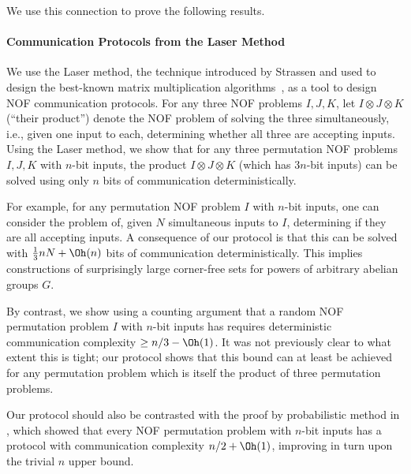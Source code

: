 We use this connection to prove the following results.

    \paragraph{Communication Protocols from the Laser Method} We use the Laser method, the technique introduced by Strassen and used to design the best-known matrix multiplication algorithms~\cite{S86,CW87}, as a tool to design NOF communication protocols. For any three NOF problems $I, J, K$, let $I \otimes J \otimes K$ (``their product'') denote the NOF problem of solving the three simultaneously, i.e., given one input to each, determining whether all three are accepting inputs. Using the Laser method, we show that for any three permutation NOF problems $I, J, K$ with $n$-bit inputs, the product $I \otimes J \otimes K$ (which has $3n$-bit inputs) can be solved using only $n$ bits of communication deterministically.
    
    For example, for any permutation NOF problem $I$ with $n$-bit inputs, one can consider the problem of, given $N$ simultaneous inputs to $I$, determining if they are all accepting inputs. A consequence of our protocol is that this can be solved with $\frac13 n N + \Oh(n)$ bits of communication deterministically. This implies constructions of surprisingly large corner-free sets for powers of arbitrary abelian groups $G$.
    
    By contrast, we show using a counting argument that a random NOF permutation problem $I$ with $n$-bit inputs has requires deterministic communication complexity $\geq n/3 - \Oh(1)$. It was not previously clear to what extent this is tight; our protocol shows that this bound can at least be achieved for any permutation problem which is itself the product of three permutation problems.
    
    Our protocol should also be contrasted with the proof by probabilistic method in \cite{CFTZ21}, which showed that every NOF permutation problem with $n$-bit inputs has a protocol with communication complexity $n/2 + \Oh(1)$, improving in turn upon the trivial $n$ upper bound.
    
    

